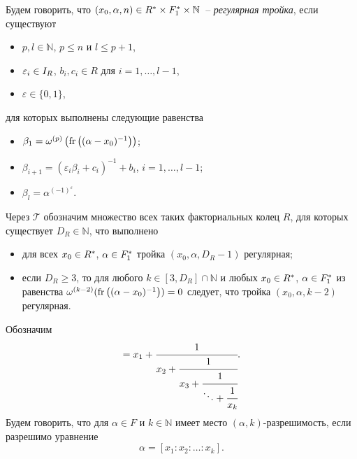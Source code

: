 \documentclass[_00_dissertation.tex]{subfiles}
\begin{document}
\begin{definition}
    Будем говорить, что $(x_0, \alpha, n) \in R^{*} \times F_1^{*} \times \mathbb{N}$~-- \emph{регулярная тройка}, если существуют
    \begin{itemize}
        \item $p, l \in \mathbb{N}$, $p \le n$ и $l \le p+1$,

        \item $\varepsilon_i \in I_{R}$, $b_i, c_i \in R$ для $i = 1, \dots, l-1$,

        \item $\varepsilon \in \{0, 1\}$,
    \end{itemize}
    для которых выполнены следующие равенства
    \begin{itemize}
        \item $\beta_1 = \omega^{(p)}\left(\textrm{fr}\left((\alpha - x_0)^{-1}\right)\right)$;

        \item $\beta_{i+1} = (\varepsilon_i \beta_i + c_i)^{-1} + b_i$, $i = 1, \dots, l-1$;

        \item $\beta_{l} = \alpha^{(-1)^{\varepsilon}}$.
    \end{itemize}
\end{definition}

\begin{definition}
    Через $\mathcal{T}$ обозначим множество всех таких факториальных колец $R$, для которых существует $D_R \in \mathbb{N}$, что выполнено
    \begin{itemize}
        \item для всех $x_0 \in R^{*}$, $\alpha \in F_1^{*}$ тройка $(x_0, \alpha, D_R - 1)$ регулярная;

        \item если $D_R \ge 3$, то для любого $k \in [3, D_R] \cap \mathbb{N}$ и любых $x_0 \in R^{*}$, $\alpha \in F_1^{*}$ из равенства $\omega^{(k-2)}(\textrm{fr}\left((\alpha - x_0)^{-1}\right)) = 0$ следует, что тройка $(x_0, \alpha, k-2)$ регулярная.
    \end{itemize}
\end{definition}

\begin{definition}
    Обозначим
    \begin{equation*}
        [x_1: x_2: \dots: x_k] = x_{1} + \cfrac{1}{
            x_{2} + \cfrac{1}{
                x_{3} + \cfrac{1}{
                    \ddots + \cfrac{1}{
                        x_{k}
                    }
                }
            }
        }.
    \end{equation*}
    Будем говорить, что для $\alpha \in F$ и $k \in \mathbb{N}$ имеет место $(\alpha, k)$-разрешимость, если разрешимо уравнение
    \begin{equation*}
        \alpha = [x_1: x_2: \dots: x_k].
    \end{equation*}
\end{definition}
\end{document}
